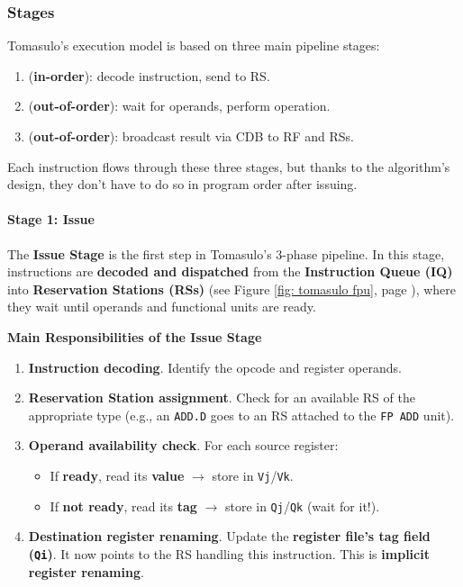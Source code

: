 \subsubsection{Stages}

Tomasulo's execution model is based on three main pipeline stages:
\begin{enumerate}
    \item {} (\textbf{in-order}): decode instruction, send to RS.
    \item {} (\textbf{out-of-order}): wait for operands, perform operation.
    \item {} (\textbf{out-of-order}): broadcast result via CDB to RF and RSs.
\end{enumerate}
Each instruction flows through these three stages, but thanks to the algorithm's design, they don't have to do so in program order after issuing.

\longline

\paragraph{Stage 1: Issue}

The \textbf{Issue Stage} is the first step in Tomasulo's 3-phase pipeline. In this stage, instructions are \textbf{decoded and dispatched} from the \textbf{Instruction Queue (IQ)} into \textbf{Reservation Stations (RSs)} (see Figure \ref{fig: tomasulo fpu}, page \pageref{fig: tomasulo fpu}), where they wait until operands and functional units are ready.

\highspace
\begin{flushleft}
    \textcolor{Green3}{ \textbf{Main Responsibilities of the Issue Stage}}
\end{flushleft}
\begin{enumerate}
    \item \textbf{Instruction decoding}. Identify the opcode and register operands.
    \item \textbf{Reservation Station assignment}. Check for an available RS of the appropriate type (e.g., an \texttt{ADD.D} goes to an RS attached to the \texttt{FP ADD} unit).
    \item \textbf{Operand availability check}. For each source register:
    \begin{itemize}
        \item[\textcolor{Green3}{\faIcon{check}}] If \textbf{ready}, read its \textbf{value} $\rightarrow$ store in \texttt{Vj}/\texttt{Vk}.
        \item[\textcolor{Red2}{\faIcon{times}}] If \textbf{not ready}, read its \textbf{tag} $\rightarrow$ store in \texttt{Qj}/\texttt{Qk} (wait for it!).
    \end{itemize}
    \item \textbf{Destination register renaming}. Update the \textbf{register file's tag field (\texttt{Qi})}. It now points to the RS handling this instruction. This is \textbf{implicit register renaming}.
\end{enumerate}

